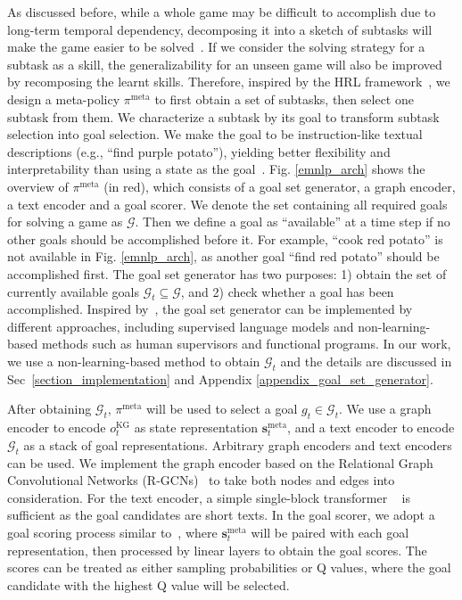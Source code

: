 \documentclass[11pt]{article}
\begin{document}
As discussed before, while a whole game may be difficult to accomplish due to long-term temporal dependency, decomposing it into a sketch of subtasks will make the game easier to be solved~\cite{sohn2018subtask,shiarlis2018taco}. 
If we consider the solving strategy for a subtask as a skill, the generalizability for an unseen game will also be improved by recomposing the learnt skills. 
Therefore, inspired by the HRL framework~\cite{sutton1999hrl}, we design a meta-policy $\pi^{\text{meta}}$ to first obtain a set of subtasks, then select one subtask from them. We characterize a subtask by its goal to transform subtask selection into goal selection.
We make the goal to be instruction-like textual descriptions (e.g., ``find purple potato''), yielding better flexibility and interpretability than using a state as the goal~\cite{andrychowicz2017her}.
Fig. \ref{emnlp_arch} shows the overview of $\pi^{\text{meta}}$ (in red), which consists of a goal set generator, a graph encoder, a text encoder and a goal scorer. We denote the set containing all required goals for solving a game as $\mathcal{G}$.
Then we define a goal as ``available'' at a time step if no other goals should be accomplished before it. For example, ``cook red potato'' is not available in Fig. \ref{emnlp_arch}, as another goal ``find red potato'' should be accomplished first. The goal set generator has two purposes: 1) obtain the set of currently available goals $\mathcal{G}_t \subseteq \mathcal{G}$, and 2) check whether a goal has been accomplished. 
Inspired by~\cite{jiang2019hrl}, the goal set generator can be implemented by different approaches, including supervised language models and non-learning-based methods such as human supervisors and functional programs. 
In our work, we use a non-learning-based method to obtain $\mathcal{G}_t$ and the details are discussed in Sec~\ref{section_implementation} and Appendix \ref{appendix_goal_set_generator}.

After obtaining $\mathcal{G}_t$, $\pi^{\text{meta}}$ will be used to select a goal $g_t \in \mathcal{G}_t$. 
We use a graph encoder to encode $o_t^{\text{KG}}$ as state representation $\bm{s}_t^{\text{meta}}$, and a text encoder to encode $\mathcal{G}_t$ as a stack of goal representations. 
Arbitrary graph encoders and text encoders can be used. 
We implement the graph encoder based on the Relational Graph Convolutional Networks (R-GCNs)~\cite{schlichtkrull2018rgcn} to take both nodes and edges into consideration. 
For the text encoder, a simple single-block transformer ~\cite{vaswani2017transformer} is sufficient as the goal candidates are short texts. 
In the goal scorer, we adopt a goal scoring process similar to~\cite{he2016drrn}, where $\bm{s}_t^{\text{meta}}$ will be paired with each goal representation, then processed by linear layers to obtain the goal scores. 
The scores can be treated as either sampling probabilities or Q values, where the goal candidate with the highest Q value will be selected. 
\end{document}
